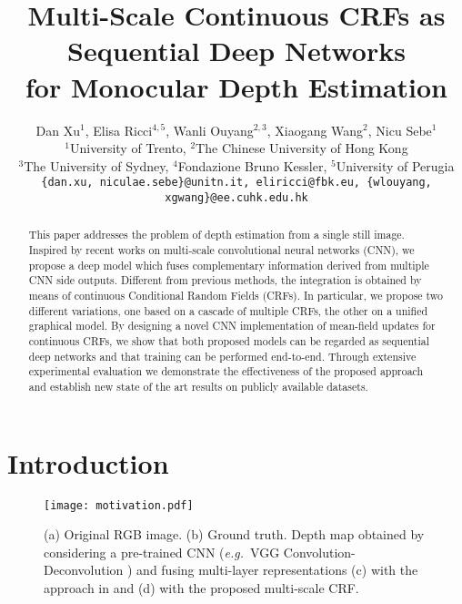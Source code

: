 \documentclass[10pt,twocolumn,letterpaper]{article}
\def\eg{\textit{e.g.}~}
\begin{document}
\title{Multi-Scale Continuous CRFs as Sequential Deep Networks \\for Monocular Depth Estimation}

\author{Dan Xu$^1$, Elisa Ricci$^{4,5}$, Wanli Ouyang$^{2,3}$, Xiaogang Wang$^2$, Nicu Sebe$^1$\\
$^1$University of Trento, $^{2}$The Chinese University of Hong Kong\\
$^3$The University of Sydney, $^4$Fondazione Bruno Kessler, $^5$University of Perugia\\
{\tt\small \{dan.xu, niculae.sebe\}@unitn.it, eliricci@fbk.eu, \{wlouyang, xgwang\}@ee.cuhk.edu.hk}  
}

\maketitle
\newcommand\figcaption{\def\@captype{figure}\caption} 
  \newcommand\tabcaption{\def\@captype{table}\caption} 



\begin{abstract}
This paper addresses the problem of depth estimation from a single still image.
Inspired by recent works on multi-scale convolutional neural networks (CNN), we propose a 
deep model which fuses complementary information derived from multiple CNN side outputs.
Different from previous methods, the integration is obtained by means of 
continuous Conditional Random Fields (CRFs). In particular, we propose {two different variations}, 
one based on a cascade of multiple CRFs, the other on a unified graphical model. By designing a novel CNN
implementation of mean-field updates for continuous CRFs, we show that both proposed models
can be regarded as sequential deep networks and that 
training can be performed end-to-end. Through extensive experimental evaluation we demonstrate the effectiveness of the proposed approach 
and establish new state of the art results on publicly available datasets. 
\end{abstract}

\section{Introduction}
\begin{figure}[t]
\centering
\texttt{[image: motivation.pdf]}
\caption{(a) Original RGB image. (b) Ground truth. Depth map obtained by considering a pre-trained CNN (\eg VGG 
Convolution-Deconvolution \cite{noh2015learning})
and fusing multi-layer representations (c) with the approach in
\cite{xie2015holistically} and (d) with the proposed multi-scale CRF. }
\label{motivation}
\vspace{-0.5cm}
\end{figure}
\end{document}
